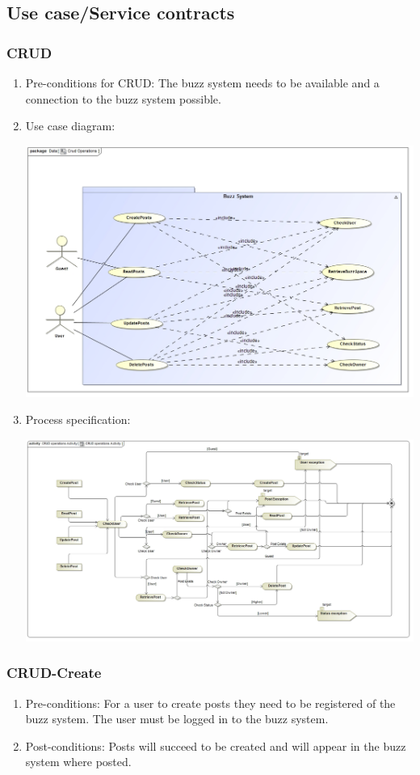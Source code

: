 \documentclass[hidelinks, 12pt, oneside]{article}
\begin{document}
\subsection{Use case/Service contracts}
\subsubsection{CRUD}
\begin{enumerate}
 \item Pre-conditions for CRUD: The buzz system needs to be available and a connection to the buzz system possible.
 
  \item Use case diagram:\\ 
 \centerline{\includegraphics[scale=0.3]{CRUDOperations}}
 \item Process specification:\\ 
 \centerline{\includegraphics[scale=0.3]{CRUDOperationsActivity}} 
\end{enumerate}

\subsubsection{CRUD-Create}
\begin{enumerate}
 \item Pre-conditions: For a user to create posts they need to be registered of the buzz system. The user must be logged in to the buzz system.

 \item Post-conditions: Posts will succeed to be created and will appear in the buzz system where posted.

\end{enumerate}
\end{document}

